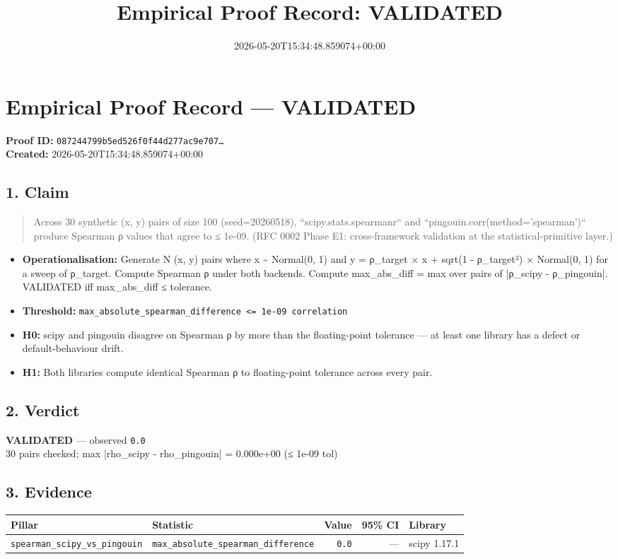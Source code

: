 \documentclass{article}
\title{Empirical Proof Record: VALIDATED}
\date{2026-05-20T15:34:48.859074+00:00}
\begin{document}
\maketitle
\section*{Empirical Proof Record --- \textcolor{validated}{\textbf{VALIDATED}}}
\textbf{Proof ID:} \texttt{087244799b5ed526f0f44d277ac9e707\dots}\\
\textbf{Created:} 2026-05-20T15:34:48.859074+00:00
\subsection*{1. Claim}
\begin{quote}Across 30 synthetic (x, y) pairs of size 100 (seed=20260518), ``scipy.stats.spearmanr`` and ``pingouin.corr(method='spearman')`` produce Spearman ρ values that agree to ≤ 1e-09. (RFC 0002 Phase E1: cross-framework validation at the statistical-primitive layer.)\end{quote}
\begin{itemize}
\item \textbf{Operationalisation:} Generate N (x, y) pairs where x \textasciitilde{} Normal(0, 1) and y = ρ\_target × x + sqrt(1 - ρ\_target²) × Normal(0, 1) for a sweep of ρ\_target. Compute Spearman ρ under both backends. Compute max\_abs\_diff = max over pairs of |ρ\_scipy - ρ\_pingouin|. VALIDATED iff max\_abs\_diff ≤ tolerance.
\item \textbf{Threshold:} \texttt{max\_absolute\_spearman\_difference <= 1e-09 correlation}
\item \textbf{H0:} scipy and pingouin disagree on Spearman ρ by more than the floating-point tolerance — at least one library has a defect or default-behaviour drift.
\item \textbf{H1:} Both libraries compute identical Spearman ρ to floating-point tolerance across every pair.
\end{itemize}
\subsection*{2. Verdict}
\textcolor{validated}{\textbf{VALIDATED}} --- observed \texttt{0.0}\\
30 pairs checked; max |rho\_scipy - rho\_pingouin| = 0.000e+00 (≤ 1e-09 tol)
\subsection*{3. Evidence}
\begin{tabular}{llrrl}\toprule
\textbf{Pillar} & \textbf{Statistic} & \textbf{Value} & \textbf{95\% CI} & \textbf{Library} \\\midrule
\texttt{spearman\_scipy\_vs\_pingouin} & \texttt{max\_absolute\_spearman\_difference} & \texttt{0.0} & --- & scipy 1.17.1 \\
\bottomrule\end{tabular}
\end{document}
